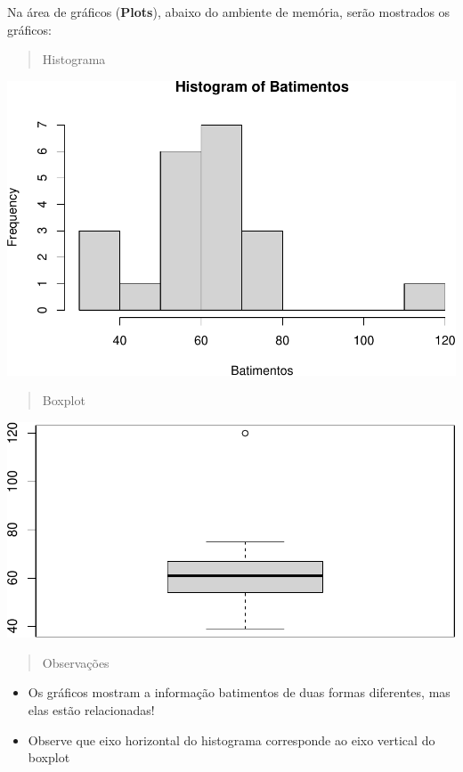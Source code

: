 \documentclass[
]{book}
\begin{document}
Na área de gráficos (\textbf{Plots}), abaixo do ambiente de memória, serão mostrados os gráficos:

\begin{quote}
Histograma
\end{quote}

\includegraphics{Livro-Estatistica+R_files/figure-latex/unnamed-chunk-14-1.pdf}

\begin{quote}
Boxplot
\end{quote}

\includegraphics{Livro-Estatistica+R_files/figure-latex/unnamed-chunk-15-1.pdf}

\begin{quote}
Observações
\end{quote}

\begin{itemize}
\item
  Os gráficos mostram a informação batimentos de duas formas diferentes, mas elas estão relacionadas!
\item
  Observe que eixo horizontal do histograma corresponde ao eixo vertical do boxplot
\end{itemize}
\end{document}
